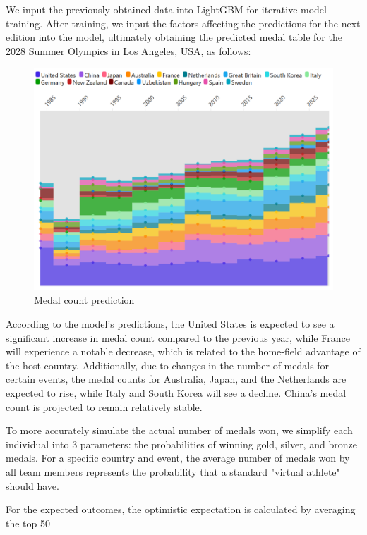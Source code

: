 \documentclass[12pt]{article}  %
\begin{document}
We input the previously obtained data into LightGBM for iterative model training. After training, we input the factors affecting the predictions for the next edition into the model, ultimately obtaining the predicted medal table for the 2028 Summer Olympics in Los Angeles, USA, as follows:
\begin{figure}[htbp]
	\centering
	\includegraphics[width=12cm]{img/Predict.png}
	\caption{Medal count prediction}
	\label{fig:aa}
\end{figure}
According to the model's predictions, the United States is expected to see a significant increase in medal count compared to the previous year, while France will experience a notable decrease, which is related to the home-field advantage of the host country. Additionally, due to changes in the number of medals for certain events, the medal counts for Australia, Japan, and the Netherlands are expected to rise, while Italy and South Korea will see a decline. China's medal count is projected to remain relatively stable.

To more accurately simulate the actual number of medals won, we simplify each individual into 3 parameters: the probabilities of winning gold, silver, and bronze medals. For a specific country and event, the average number of medals won by all team members represents the probability that a standard "virtual athlete" should have.

For the expected outcomes, the optimistic expectation is calculated by averaging the top 50%
\end{document}
